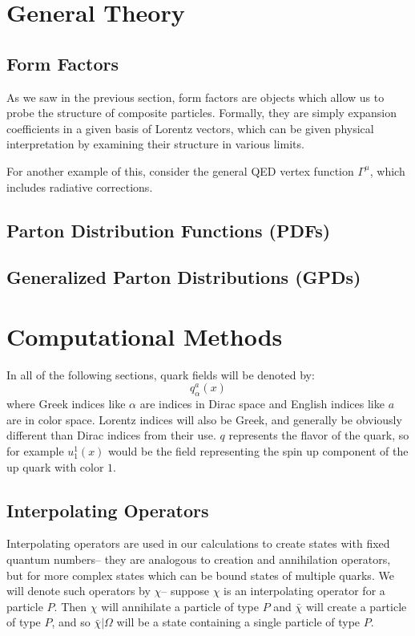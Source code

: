 \documentclass[11pt, oneside]{article}   	%
\theoremstyle{definition}
\begin{document}
\newpage
\section{General Theory}

\subsection{Form Factors}

As we saw in the previous section, form factors are objects which allow us to probe the structure of composite particles. Formally, 
they are simply expansion coefficients in a given basis of Lorentz vectors, which can be given physical interpretation by 
examining their structure in various limits. 

For another example of this, consider the general QED vertex function $\Gamma^\mu$, which includes radiative corrections. 

\subsection{Parton Distribution Functions (PDFs)}

\subsection{Generalized Parton Distributions (GPDs)}

\newpage
\section{Computational Methods}

In all of the following sections, quark fields will be denoted by:
\begin{equation}
	q_\alpha^a(x)
\end{equation}
where Greek indices like $\alpha$ are indices in Dirac space and English indices like $a$ are in color space. Lorentz indices will also be 
Greek, and generally be obviously different than Dirac indices from their use. $q$ represents the flavor of the quark, so for example $u_1^1(x)$ 
would be the field representing the spin up component of the up quark with color $1$.

\subsection{Interpolating Operators}

Interpolating operators are used in our calculations to create states with fixed quantum numbers-- they are analogous to creation and annihilation 
operators, but for more complex states which can be bound states of multiple quarks. We will denote such operators by $\chi$-- suppose 
$\chi$ is an interpolating operator for a particle $P$. Then $\chi$ will annihilate a particle of type $P$ and $\bar\chi$ will create a particle of type 
$P$, and so $\bar\chi |\Omega$ will be a state containing a single particle of type $P$. 
\end{document}
